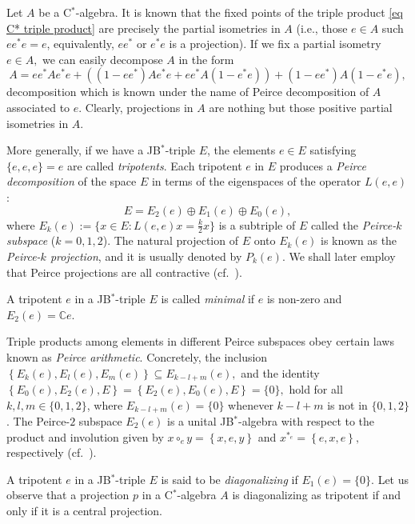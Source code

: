 \documentclass[10pt]{amsart}
\def\J#1#2#3{ \left\{ #1,#2,#3 \right\} }
\begin{document}
Let $A$ be a C$^*$-algebra. It is known that the fixed points of the triple product \eqref{eq C* triple product} are precisely the partial isometries in $A$ (i.e., those $e\in A$ such $e e^* e = e$, equivalently, $ee^*$ or $e^* e$ is a projection). If we fix a partial isometry $e\in A,$ we can easily decompose $A$ in the form $$A = ee^* A e^*e + \left( (1-ee^*) A e^*e + ee^* A (1-e^*e) \right) + (1-ee^*) A (1-e^*e), $$ decomposition which is known under the name of Peirce decomposition of $A$ associated to $e$. Clearly, projections in $A$ are nothing but those positive partial isometries in $A$.
	
	
More generally, if we have a JB$^*$-triple $E$, the elements $e\in E$ satisfying $\{e,e,e\}=e$ are called \emph{tripotents}.  Each tripotent $e$ in $E$ produces a \emph{Peirce decomposition} of the space $E$ in terms of the eigenspaces of the operator $L(e,e)$:
	\begin{equation}\label{Peirce decomp} {E} = {E}_{2} (e) \oplus  {E}_{1} (e) \oplus {E}_{0} (e),\end{equation} where ${
		E}_{k} (e) := \{ x\in {E}\colon L(e,e)x = {\frac k 2} x\}$ is a subtriple of ${E}$ called the \emph{Peirce-$k$ subspace} ($k=0,1,2$). The natural projection of ${E}$ onto ${E}_{k} (e)$ is known as the  \emph{Peirce-$k$ projection}, and it is usually denoted by $P_{k} (e)$. We shall later employ that Peirce projections are all contractive (cf.\ \cite[Corollary 1.2]{FriRu85}).
	
A tripotent $e$ in a JB$^*$-triple $E$ is called \emph{minimal} if $e$ is non-zero and $E_2(e) = \mathbb{C} e.$
	
Triple products among elements in different Peirce subspaces obey certain laws known as \emph{Peirce arithmetic}. Concretely, the inclusion $\J {{E}_{k}(e)}{{E}_{l}(e)}{{E}_{m}(e)}\! \subseteq {E}_{k-l+m} (e),$ and the identity $\J {{E}_{0}(e)}{{E}_{2} (e)}{{E}}\! =\! \J {{E}_{2} (e)}{{E}_{0} (e)}{{E}}\! =\! \{0\},$ hold for all $k,l,m\in \{0,1,2\}$, where ${E}_{k-l+m} (e) = \{0\}$ whenever $k-l+m$ is not in $\{0,1,2\}$. The Peirce-$2$ subspace ${E}_{2} (e)$ is a unital JB$^*$-algebra with respect to the product and involution given by $x \circ_e y = \J xey$ and $x^{*_e} = \J exe,$ respectively (cf.\ \cite[Corollary~4.2.30]{Cabrera-Rodriguez-vol1}).
	
	A tripotent $e$ in a JB$^*$-triple $E$ is said to be \emph{diagonalizing} if $E_1 (e) =\{0\}$. Let us observe that a projection $p$ in a C$^*$-algebra $A$ is diagonalizing as tripotent if and only if it is a central projection.
	
\end{document}
